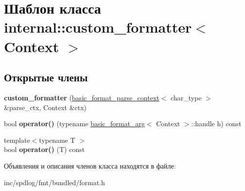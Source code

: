 \hypertarget{classinternal_1_1custom__formatter}{}\section{Шаблон класса internal\+:\+:custom\+\_\+formatter$<$ Context $>$}
\label{classinternal_1_1custom__formatter}
\subsection*{Открытые члены}
\begin{DoxyCompactItemize}
\item 
\mbox{\label{classinternal_1_1custom__formatter_a8fbbc7854f1fdc75d1d8a604ce693bcc}} 
{\bfseries custom\+\_\+formatter} (\hyperlink{classbasic__format__parse__context}{basic\+\_\+format\+\_\+parse\+\_\+context}$<$ char\+\_\+type $>$ \&parse\+\_\+ctx, Context \&ctx)
\item 
\mbox{\label{classinternal_1_1custom__formatter_a1e1744319dbd96e70b337d4bbc655e52}} 
bool {\bfseries operator()} (typename \hyperlink{classbasic__format__arg}{basic\+\_\+format\+\_\+arg}$<$ Context $>$\+::handle h) const
\item 
\mbox{\label{classinternal_1_1custom__formatter_a008a76efccadc0bd70813c47e37ba91b}} 
{\footnotesize template$<$typename T $>$ }\\bool {\bfseries operator()} (T) const
\end{DoxyCompactItemize}


Объявления и описания членов класса находятся в файле\+:\begin{DoxyCompactItemize}
\item 
inc/spdlog/fmt/bundled/format.\+h\end{DoxyCompactItemize}
